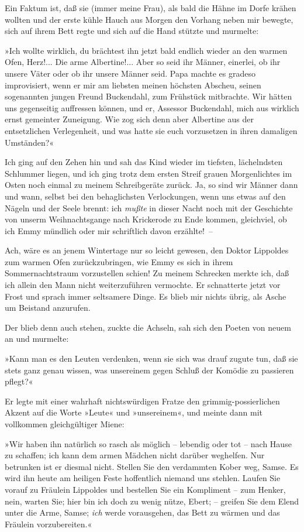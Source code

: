 Ein Faktum ist, daß sie (immer meine Frau), als bald die Hähne im
Dorfe krähen wollten und der erste kühle Hauch aus Morgen den
Vorhang neben mir bewegte, sich auf ihrem Bett regte und sich auf
die Hand stützte und murmelte:

»Ich wollte wirklich, du brächtest ihn jetzt bald endlich wieder an
den warmen Ofen, Herz!... Die arme Albertine!... Aber so seid ihr
Männer, einerlei, ob ihr unsere Väter oder ob ihr unsere Männer
seid. Papa machte es gradeso improvisiert, wenn er mir am liebsten
meinen höchsten Abscheu, seinen sogenannten jungen Freund
Buckendahl, zum Frühstück mitbrachte. Wir hätten uns gegenseitig
auffressen können, und er, Assessor Buckendahl, mich aus wirklich
ernst gemeinter Zuneigung. Wie zog sich denn aber Albertine aus der
entsetzlichen Verlegenheit, und was hatte sie euch vorzusetzen in
ihren damaligen Umständen?«

Ich ging auf den Zehen hin und sah das Kind wieder im tiefsten,
lächelndsten Schlummer liegen, und ich ging trotz dem ersten Streif
grauen Morgenlichtes im Osten noch einmal zu meinem Schreibgeräte
zurück. Ja, so sind wir Männer dann und wann, selbst bei den
behaglichsten Verlockungen, wenn uns etwas auf den Nägeln und der
Seele brennt: ich \emph{mußte} in dieser Nacht noch mit der
Geschichte von unserm Weihnachtsgange nach Krickerode zu Ende
kommen, gleichviel, ob ich Emmy mündlich oder mir schriftlich davon
erzählte!~–

Ach, wäre es an jenem Wintertage nur so leicht gewesen, den Doktor
Lippoldes zum warmen Ofen zurückzubringen, wie Emmy es sich in
ihrem Sommernachtstraum vorzustellen schien! Zu meinem Schrecken
merkte ich, daß ich allein den Mann nicht weiterzuführen vermochte.
Er schnatterte jetzt vor Frost und sprach immer seltsamere Dinge.
Es blieb mir nichts übrig, als Asche um Beistand anzurufen.

Der blieb denn auch stehen, zuckte die Achseln, sah sich den Poeten
von neuem an und murmelte:

»Kann man es den Leuten verdenken, wenn sie sich was drauf zugute
tun, daß sie stets ganz genau wissen, was unsereinem gegen Schluß
der Komödie zu passieren pflegt?«

Er legte mit einer wahrhaft nichtswürdigen Fratze den
grimmig-possierlichen Akzent auf die Worte »Leute« und
»unsereinem«, und meinte dann mit vollkommen gleichgültiger Miene:

»Wir haben ihn natürlich so rasch als möglich – lebendig oder tot –
nach Hause zu schaffen; ich kann dem armen Mädchen nicht darüber
weghelfen. Nur betrunken ist er diesmal nicht. Stellen Sie den
verdammten Kober weg, Samse. Es wird ihn heute am heiligen Feste
hoffentlich niemand uns stehlen. Laufen Sie vorauf zu Fräulein
Lippoldes und bestellen Sie ein Kompliment – zum Henker, nein,
warten Sie; hier bin ich doch zu wenig nütze, Ebert; – greifen Sie
dem Elend unter die Arme, Samse; \emph{ich} werde vorausgehen, das
Bett zu wärmen und das Fräulein vorzubereiten.«

